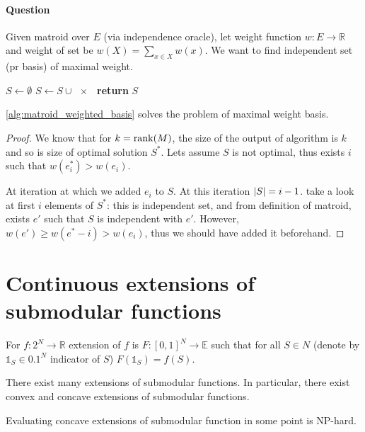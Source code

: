 \paragraph{Question} Given matroid over $E$ (via independence oracle), let weight function $w: E\to \mathbb{R}$ and weight of set be $w(X) = \sum_{x\in X} w(x)$. We want to find independent set (pr basis) of maximal weight.


\begin{algorithm}
	\caption{}\label{alg:matroid_weighted_basis}
	\begin{algorithmic}[1]
		\State $S \gets \emptyset$
		\State $S\gets S\cup \qty{x}$
		\EndIf
		\EndFor
		\State \textbf{return} $S$
		\EndProcedure
	\end{algorithmic}
\end{algorithm}
\begin{prop}
	\vref{alg:matroid_weighted_basis} solves the problem of maximal weight basis.
	\begin{proof}
		We know that for $k = \rank(M)$, the size of the output of algorithm is $k$ and so is size of optimal solution $S^*$.
		Lets assume $S$ is not optimal, thus exists $i$ such that $w(e_i^*) > w(e_i)$.
		
		At iteration at which we added $e_i$ to $S$. At this iteration $\abs{S}=i-1$. take a look at first $i$ elements of $S^*$: this is independent set, and from definition of matroid, exists $e'$ such that $S$ is independent with $e'$. However, $w(e') \geq w(e^*-i) > w(e_i)$, thus we should have added it beforehand.
	\end{proof}
\end{prop}

\section{Continuous extensions of submodular functions} 
\begin{definition}
	For $f: 2^N \to \mathbb{R}$ extension of $f$ is $F: [0,1]^N \to \mathbb{E}$ such that for all $S\in N$ (denote by $\mathds{1}_S \in \qty{0,1}^N$ indicator of $S$) $F(\mathds{1}_S) = f(S)$.
\end{definition}

There exist many extensions of submodular functions. In particular, there exist convex and concave extensions of submodular functions. 
\begin{prop}
	Evaluating concave extensions of submodular function in some point is NP-hard.
\end{prop}